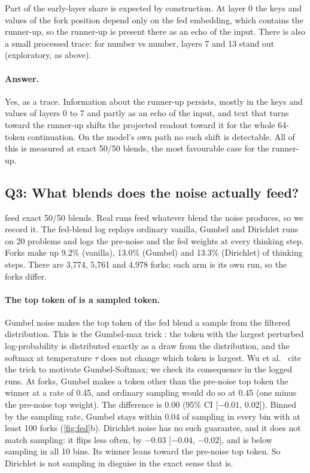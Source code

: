 Part of the early-layer share is expected by construction.
At layer 0 the keys and values of the fork position depend only on the fed embedding, which contains the runner-up,
so the runner-up is present there as an echo of the input.
There is also a small processed trace: for number vs number, layers 7 and 13 stand out (exploratory, as above). %

\paragraph{Answer.}
Yes, as a trace.
Information about the runner-up persists, mostly in the keys and values of layers 0 to 7 and partly as an echo of %
the input, and text that turns toward the runner-up shifts the projected readout toward it for the whole 64-token %
continuation.
On the model's own path no such shift is detectable.
All of this is measured at exact 50/50 blends, the most favourable case for the runner-up.

\subsection{Q3: What blends does the noise actually feed?}\label{sec:q3}

 feed exact 50/50 blends.
Real runs feed whatever blend the noise produces, so we record it.
The fed-blend log replays ordinary vanilla, Gumbel and Dirichlet runs on 20 problems and logs the pre-noise and the fed weights %
at every thinking step.
Forks make up 9.2\% (vanilla), 13.0\% (Gumbel) and 13.3\% (Dirichlet) of thinking steps. %
There are 3,774, 5,761 and 4,978 forks; each arm is its own run, so the forks differ. %

\paragraph{The top token of \GST{} is a sampled token.}
Gumbel noise makes the top token of the fed blend a sample from the filtered distribution.
This is the Gumbel-max trick \cite{gumbel1954statistical,maddison2014sampling}:
the token with the largest perturbed log-probability is distributed exactly as a draw from the distribution, and the
softmax at temperature $\tau$ does not change which token is largest.
Wu et al.~\cite{wu2025single} cite the trick to motivate Gumbel-Softmax; we check its consequence in the logged runs.
At forks, Gumbel makes a token other than the pre-noise top token the winner at a rate of 0.45, %
and ordinary sampling would do so at 0.45 (one minus the pre-noise top weight). %
The difference is 0.00 (95\% CI [$-0.01$, 0.02]). %
Binned by the sampling rate, Gumbel stays within 0.04 of sampling in every bin with at least 100 forks %
(\cref{fig:fed}b).
Dirichlet noise has no such guarantee, and it does not match sampling:
it flips less often, by $-0.03$ [$-0.04$, $-0.02$], and is below sampling in all 10 bins. %
Its winner leans toward the pre-noise top token.
So Dirichlet \ST{} is not sampling in disguise in the exact sense that \GST{} is.


